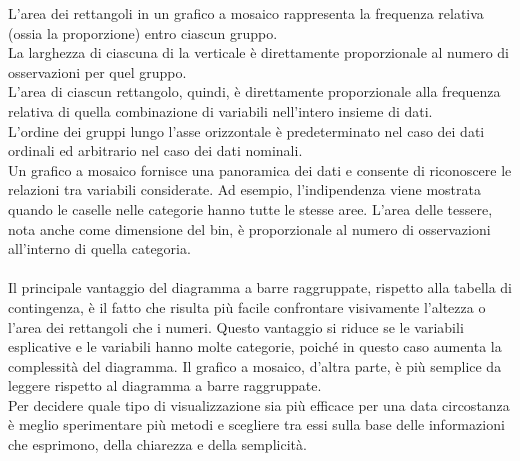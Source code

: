 \documentclass[10pt, draft]{book}
\begin{document}
L'area dei rettangoli in un grafico a mosaico rappresenta la frequenza relativa (ossia la proporzione) entro ciascun gruppo.
\\
La larghezza di ciascuna di la verticale è direttamente proporzionale al numero di osservazioni per quel gruppo.
\\
L'area di ciascun rettangolo, quindi, è direttamente proporzionale alla frequenza relativa di quella combinazione di variabili nell'intero insieme di dati.
\\
L'ordine dei gruppi lungo l'asse orizzontale è predeterminato nel caso dei dati ordinali ed arbitrario nel caso dei dati nominali.
\\
Un grafico a mosaico fornisce una panoramica dei dati e consente di riconoscere le relazioni tra variabili considerate. Ad esempio, l'indipendenza viene mostrata quando le caselle nelle categorie hanno tutte le stesse aree. L'area delle tessere, nota anche come dimensione del bin, è proporzionale al numero di osservazioni all'interno di quella categoria.
\\
\\
Il principale vantaggio del diagramma a barre raggruppate, rispetto alla tabella di contingenza, è il fatto che risulta più facile confrontare visivamente l'altezza o l'area dei rettangoli che i numeri.  Questo vantaggio si riduce se le variabili esplicative e le variabili hanno molte categorie, poiché in questo caso aumenta la complessità del diagramma. Il grafico a mosaico, d'altra parte, è più semplice da leggere rispetto al diagramma a barre raggruppate.
\\
Per decidere quale tipo di visualizzazione sia più efficace per una data circostanza è meglio sperimentare più metodi e scegliere tra essi sulla base delle informazioni che esprimono, della chiarezza e della semplicità.
\end{document}
